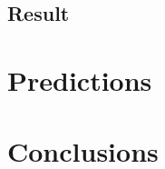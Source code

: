 \documentclass[11pt]{article}
\begin{document}
\subsection{Result}


\section{Predictions}


\section{Conclusions}
\end{document}
